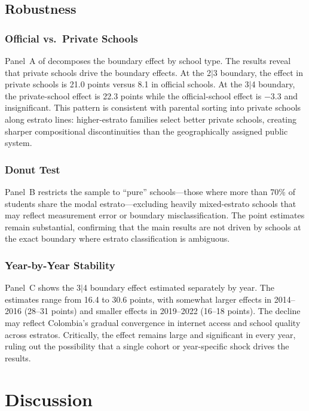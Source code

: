 \documentclass[12pt]{article}
\begin{document}
\subsection{Robustness}



\subsubsection*{Official vs.\ Private Schools} Panel~A of  decomposes the boundary effect by school type. The results reveal that private schools drive the boundary effects. At the 2$|$3 boundary, the effect in private schools is 21.0 points versus 8.1 in official schools. At the 3$|$4 boundary, the private-school effect is 22.3 points while the official-school effect is $-3.3$ and insignificant. This pattern is consistent with parental sorting into private schools along estrato lines: higher-estrato families select better private schools, creating sharper compositional discontinuities than the geographically assigned public system.

\subsubsection*{Donut Test} Panel~B restricts the sample to ``pure'' schools---those where more than 70\% of students share the modal estrato---excluding heavily mixed-estrato schools that may reflect measurement error or boundary misclassification. The point estimates remain substantial, confirming that the main results are not driven by schools at the exact boundary where estrato classification is ambiguous.

\subsubsection*{Year-by-Year Stability} Panel~C shows the 3$|$4 boundary effect estimated separately by year. The estimates range from 16.4 to 30.6 points, with somewhat larger effects in 2014--2016 (28--31 points) and smaller effects in 2019--2022 (16--18 points). The decline may reflect Colombia's gradual convergence in internet access and school quality across estratos. Critically, the effect remains large and significant in every year, ruling out the possibility that a single cohort or year-specific shock drives the results.

\section{Discussion}
\end{document}
